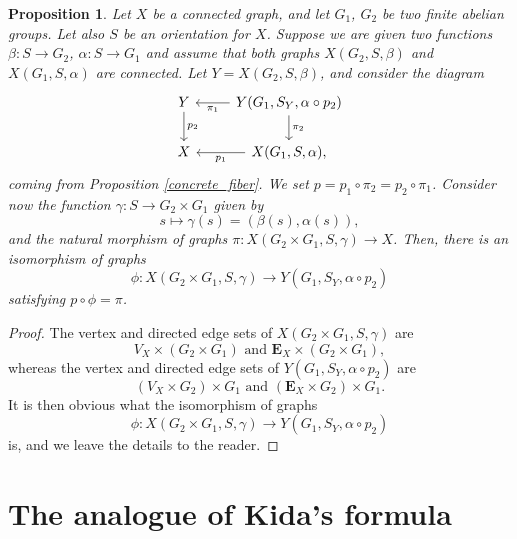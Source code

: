\documentclass[11pt]{amsart}
\newtheorem{proposition}[theorem]{Proposition}
\numberwithin{equation}{section}
\theoremstyle{remark}
\begin{document}
\begin{proposition} \label{combine_volt}
Let $X$ be a connected graph, and let $G_{1}$, $G_{2}$ be two finite abelian groups.  Let also $S$ be an orientation for $X$.  Suppose we are given two functions $\beta:S \rightarrow G_{2}$, $\alpha:S \rightarrow G_{1}$ and assume that both graphs $X(G_{2},S,\beta)$ and $X(G_{1},S,\alpha)$ are connected.  Let $Y = X(G_{2},S,\beta)$, and consider the diagram
\begin{equation*}
\begin{tikzcd}
Y \arrow["p_{2}",d] & \arrow["\pi_{1}",l]  \arrow["\pi_{2}",d] Y(G_{1},S_{Y},\alpha \circ p_{2}) \\
X & \arrow["p_{1}",l] X(G_{1},S,\alpha),
\end{tikzcd}
\end{equation*}
coming from Proposition \ref{concrete_fiber}.  We set $p = p_{1} \circ \pi_{2} = p_{2} \circ \pi_{1}$.  Consider now the function $\gamma:S \rightarrow G_{2} \times G_{1}$ given by
$$s \mapsto \gamma(s) = (\beta(s),\alpha(s)), $$
and the natural morphism of graphs $\pi:X(G_{2} \times G_{1},S,\gamma) \rightarrow X$.  Then, there is an isomorphism of graphs
$$\phi: X(G_{2} \times G_{1},S,\gamma) \rightarrow Y(G_{1},S_{Y},\alpha \circ p_{2})$$
satisfying $p \circ \phi = \pi$.
\end{proposition}
\begin{proof}
The vertex and directed edge sets of $X(G_{2}\times G_{1},S,\gamma)$ are
$$V_{X} \times (G_{2} \times G_{1}) \text{ and }  \mathbf{E}_{X} \times (G_{2} \times G_{1}), $$
whereas the vertex and directed edge sets of $Y(G_{1},S_{Y},\alpha \circ p_{2})$ are
$$ (V_{X} \times G_{2}) \times G_{1} \text{ and } (\mathbf{E}_{X} \times G_{2}) \times G_{1}.$$
It is then obvious what the isomorphism of graphs 
$$\phi:X(G_{2} \times G_{1},S,\gamma) \rightarrow Y(G_{1},S_{Y},\alpha \circ p_{2})$$ 
is, and we leave the details to the reader.
\end{proof}


\section{The analogue of Kida's formula} \label{ki_main}
\end{document}
